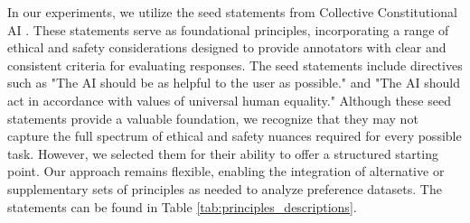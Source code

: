 \documentclass{article}
\begin{document}
In our experiments, we utilize the seed statements from Collective Constitutional AI \cite{huang2024collective}. These statements serve as foundational principles, incorporating a range of ethical and safety considerations designed to provide annotators with clear and consistent criteria for evaluating responses. The seed statements include directives such as  "The AI should be as helpful to the user as possible." and "The AI should act in accordance with values of universal human equality." Although these seed statements provide a valuable foundation, we recognize that they may not capture the full spectrum of ethical and safety nuances required for every possible task. However, we selected them for their ability to offer a structured starting point. Our approach remains flexible, enabling the integration of alternative or supplementary sets of principles as needed to analyze preference datasets. The statements can be found in Table \ref{tab:principles_descriptions}.
\end{document}
